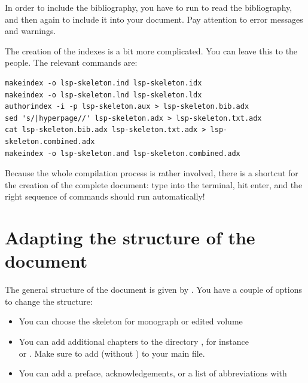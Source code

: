 In order to include the bibliography, you have to run  to read the bibliography, and then again  to include it into your document. Pay attention to error messages and warnings.

The creation of the indexes is a bit more complicated. You can leave this to the \lsp people. The relevant commands are:

\begin{verbatim}
makeindex -o lsp-skeleton.ind lsp-skeleton.idx
makeindex -o lsp-skeleton.lnd lsp-skeleton.ldx 
authorindex -i -p lsp-skeleton.aux > lsp-skeleton.bib.adx
sed 's/|hyperpage//' lsp-skeleton.adx > lsp-skeleton.txt.adx 
cat lsp-skeleton.bib.adx lsp-skeleton.txt.adx > lsp-skeleton.combined.adx 
makeindex -o lsp-skeleton.and lsp-skeleton.combined.adx
\end{verbatim}

Because the whole compilation process is rather involved, there is a shortcut for the creation of the complete document: type  into the terminal, hit enter, and the right sequence of commands should run automatically!



\section{Adapting the structure of the document}
The general structure of the document is given by \lsp. You have a couple of options to change the structure:
\begin{itemize}
 \item You can choose the skeleton for monograph or edited volume
 \item You can add additional chapters to the directory , for instance\\  or . Make sure to add  (without ) to your main file.
 \item You can add a preface, acknowledgements, or a list of abbreviations with\\ 
\end{itemize}



